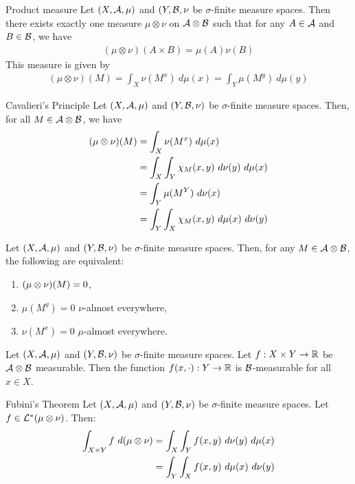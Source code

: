 \begin{importanttheorem}{Product measure}{}
	Let $(X, \mathcal{A}, \mu)$ and $(Y, \mathcal{B}, \nu$ be $\sigma$-finite measure spaces. Then there exists exactly one measure $\mu \otimes \nu$ on $\mathcal{A} \otimes \mathcal{B}$ such that for any $A \in \mathcal{A}$ and $B \in \mathcal{B}$, we have
	\begin{align*}
		(\mu \otimes \nu)(A \times B) = \mu(A)\nu(B)
	\end{align*}
	This measure is given by
	\begin{align*}
		(\mu \otimes \nu)(M) = \int_X \nu(M^x) ~d\mu(x) = \int_Y \mu(M^y) ~d\mu(y)
	\end{align*}
\end{importanttheorem}
\begin{importantcorollary}{Cavalieri's Principle}{}
	Let $(X, \mathcal{A}, \mu)$ and $(Y, \mathcal{B}, \nu)$ be $\sigma$-finite measure spaces. Then, for all $M \in \mathcal{A} \otimes \mathcal{B}$, we have
	\begin{align*}
		(\mu \otimes \nu)(M) 
		&=
		\int_X \nu(M^x) ~d\mu(x)\\
		&=
		\int_X \int_Y \chi_M(x,y) ~d\nu(y) ~d\mu(x)\\
		&=
		\int_Y \mu(M^Y) ~d\nu(x)\\
		&=
		\int_Y \int_X \chi_M(x,y) ~d\mu(x) ~d\nu(y)
	\end{align*}
\end{importantcorollary}
\begin{corollary}
	Let $(X, \mathcal{A}, \mu)$ and $(Y, \mathcal{B}, \nu)$ be $\sigma$-finite measure spaces. Then, for any $M \in \mathcal{A} \otimes \mathcal{B}$, the following are equivalent:
	\begin{enumerate}
		\item $(\mu \otimes \nu)(M) = 0$,
		\item $\mu(M^y) = 0$ $\nu$-almost everywhere,
		\item $\nu(M^x) = 0$ $\mu$-almost everywhere.
	\end{enumerate}
\end{corollary}
\begin{lemma}
	Let $(X, \mathcal{A}, \mu)$ and $(Y, \mathcal{B}, \nu)$ be $\sigma$-finite measure spaces. Let $f : X \times Y \to \mathbb{R}$ be $\mathcal{A} \otimes \mathcal{B}$ measurable. Then the function $f(x, \cdot) : Y \to \mathbb{R}$ is $\mathcal{B}$-measurable for all $x \in X$.
\end{lemma}
\begin{importanttheorem}{Fubini's Theorem}{}
	Let $(X, \mathcal{A}, \mu)$ and $(Y, \mathcal{B}, \nu)$ be $\sigma$-finite measure spaces. Let $f \in \mathcal{L}^*(\mu \otimes \nu)$. Then:
	\begin{align*}
		\int_{X \times Y} f ~d(\mu \otimes \nu)
		&=
		\int_X \int_Y f(x,y) ~d\nu(y) ~d\mu(x)\\
		&=
		\int_Y \int_X f(x,y) ~d\mu(x) ~d\nu(y)
	\end{align*}
\end{importanttheorem}
